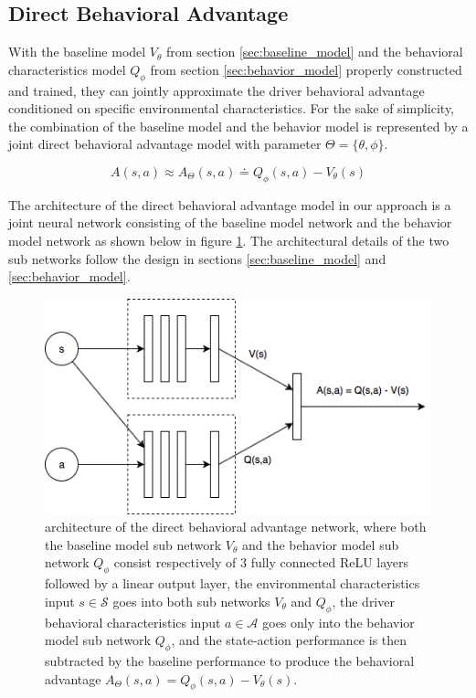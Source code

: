 \documentclass{article}
\begin{document}
\subsection{Direct Behavioral Advantage}\label{sec:direct_behavioral_advantage}

With the baseline model $ V_{\theta} $ from section \ref{sec:baseline_model} and the behavioral characteristics model $ Q_{\phi} $ from section \ref{sec:behavior_model} properly constructed and trained, they can jointly approximate the driver behavioral advantage conditioned on specific environmental characteristics. For the sake of simplicity, the combination of the baseline model and the behavior model is represented by a joint direct behavioral advantage model with parameter $ \Theta = \{ \theta, \phi \} $.

\[
A(s, a) \approx A_{\Theta}(s, a) \doteq Q_{\phi}(s, a) - V_{\theta}(s)
\]

The architecture of the direct behavioral advantage model in our approach is a joint neural network consisting of the baseline model network and the behavior model network as shown below in figure \ref{fig:advantage_network}. The architectural details of the two sub networks follow the design in sections \ref{sec:baseline_model} and \ref{sec:behavior_model}.

\begin{figure}[H]
    \centering
    \includegraphics[width=0.6\linewidth]{figures/advantage_network.png}
    \caption{architecture of the direct behavioral advantage network, where both the baseline model sub network $ V_{\theta} $ and the behavior model sub network $ Q_{\phi} $ consist respectively of $ 3 $ fully connected ReLU layers followed by a linear output layer, the environmental characteristics input $ s \in \mathcal{S} $ goes into both sub networks $ V_{\theta} $ and $ Q_{\phi} $, the driver behavioral characteristics input $ a \in \mathcal{A} $ goes only into the behavior model sub network $ Q_{\phi} $, and the state-action performance is then subtracted by the baseline performance to produce the behavioral advantage $ A_{\Theta}(s, a) = Q_{\phi}(s, a) - V_{\theta}(s) $.}
    \label{fig:advantage_network}
\end{figure}
\end{document}
